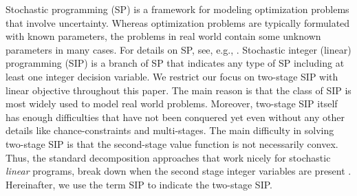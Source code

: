 Stochastic programming (SP) is a framework for modeling optimization problems that involve uncertainty. Whereas optimization problems are typically formulated with known parameters, the problems in real world contain some unknown parameters in many cases. For details on SP, see, e.g., \cite{web:SPS,book:BL2011}. Stochastic integer (linear) programming (SIP) is a branch of SP that indicates any type of SP including at least one integer decision variable. We restrict our focus on two-stage SIP with linear objective throughout this paper. The main reason is that the class of SIP is most widely used to model real world problems. Moreover, two-stage SIP itself has enough difficulties that have not been conquered yet even without any other details like chance-constraints and multi-stages. The main difficulty in solving two-stage SIP is that the second-stage value function is not necessarily convex. Thus, the standard decomposition approaches that work nicely for stochastic \textit{linear} programs, break down when the second stage integer variables are present \cite{journal:AG2004}. Hereinafter, we use the term SIP to indicate the two-stage SIP. 






